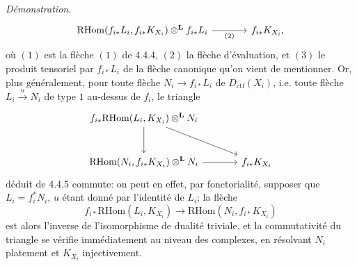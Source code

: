 \documentclass[11pt]{article}
\newenvironment{prooftext}[1][Proof]{\par\noindent\emph{#1.}\ }{\par\medskip}
\providecommand{\RHom}{\mathrm{RHom}}
\providecommand{\Dctf}{D_{\mathrm{ctf}}}
\providecommand{\Dctf}{D_{\mathrm{ctf}}}
\providecommand{\RHom}{\mathrm{RHom}}
\begin{document}
\begin{prooftext}[Démonstration]
\begin{equation}
\begin{tikzcd}[column sep=large,row sep=large]
\RHom(f_{i*}L_i,f_{i*}K_{X_i})\otimes^{\mathbf L} f_{i*}L_i
 \arrow[r,"(2)"'] &
f_{i*}K_{X_i},
\end{tikzcd}
\end{equation}
où $(1)$ est la flèche $(1)$ de 4.4.4, $(2)$ la flèche d'évaluation, et $(3)$ le produit tensoriel par $f_{i*}L_i$ de la flèche canonique qu'on vient de mentionner. Or, plus généralement, pour toute flèche $N_i\longrightarrow f_{i*}L_i$ de $\Dctf(X_i)$, i.e. toute flèche $L_i\xrightarrow{u}N_i$ de type $1$ au-dessus de $f_i$, le triangle
\[
\begin{tikzcd}[column sep=large,row sep=large]
f_{i*}\RHom(L_i,K_{X_i})\otimes^{\mathbf L}N_i
 \arrow[dr] \arrow[d] & \\
\RHom(N_i,f_{i*}K_{X_i})\otimes^{\mathbf L}N_i \arrow[r] &
f_{i*}K_{X_i}
\end{tikzcd}
\]
déduit de 4.4.5 commute: on peut en effet, par fonctorialité, supposer que $L_i=f_i^*N_i$, $u$ étant donné par l'identité de $L_i$; la flèche
\[
f_{i*}\RHom(L_i,K_{X_i})\longrightarrow\RHom(N_i,f_{i*}K_{X_i})
\]
est alors l'inverse de l'isomorphisme de dualité triviale, et la commutativité du triangle se vérifie immédiatement au niveau des complexes, en résolvant $N_i$ platement et $K_{X_i}$ injectivement.


\end{prooftext}
\end{document}
